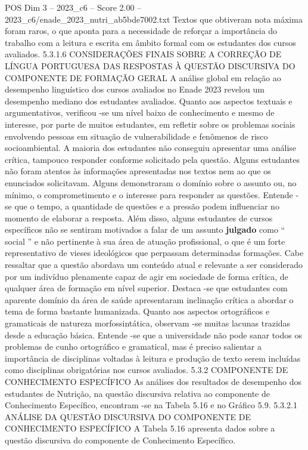 \begin{textsample}{POS Dim 3 – 2023\_c6 – Score 2.00 – 2023\_c6/enade\_2023\_nutri\_ab5bde7002.txt}
Textos que obtiveram nota máxima foram raros, o que aponta para a necessidade de reforçar a importância do trabalho com a leitura e escrita em âmbito formal com os estudantes dos cursos avaliados. 5.3.1.6 CONSIDERAÇÕES FINAIS SOBRE A CORREÇÃO DE LÍNGUA PORTUGUESA DAS RESPOSTAS À QUESTÃO DISCURSIVA DO COMPONENTE DE FORMAÇÃO GERAL A análise global em relação ao desempenho linguístico dos cursos avaliados no Enade 2023 revelou um desempenho mediano dos estudantes avaliados.
Quanto aos aspectos textuais e argumentativos, verificou -se um nível baixo de conhecimento e mesmo de interesse, por parte de muitos estudantes, em refletir sobre os problemas sociais envolvendo pessoas em situação de vulnerabilidade e fenômenos de risco socioambiental.
A maioria dos estudantes não conseguiu apresentar uma análise crítica, tampouco responder conforme solicitado pela questão.
Alguns estudantes não foram atentos às informações apresentadas nos textos nem ao que os enunciados solicitavam.
Alguns demonstraram o domínio sobre o assunto ou, no mínimo, o comprometimento e o interesse para responder as questões.
Entende -se que o tempo, a quantidade de questões e a pressão podem influenciar no momento de elaborar a resposta.
Além disso, alguns estudantes de cursos específicos não se sentiram motivados a falar de um assunto \textbf{julgado} como “ social ” e não pertinente à sua área de atuação profissional, o que é um forte representativo de vieses ideológicos que perpassam determinadas formações.
Cabe ressaltar que a questão abordava um conteúdo atual e relevante a ser considerado por um indivíduo plenamente capaz de agir em sociedade de forma crítica, de qualquer área de formação em nível superior.
Destaca -se que estudantes com aparente domínio da área de saúde apresentaram inclinação crítica a abordar o tema de forma bastante humanizada.
Quanto aos aspectos ortográficos e gramaticais de natureza morfossintática, observam -se muitas lacunas trazidas desde a educação básica.
Entende -se que a universidade não pode sanar todos os problemas de cunho ortográfico e gramatical, mas é preciso salientar a importância de disciplinas voltadas à leitura e produção de texto serem incluídas como disciplinas obrigatórias nos cursos avaliados. 5.3.2 COMPONENTE DE CONHECIMENTO ESPECÍFICO As análises dos resultados de desempenho dos estudantes de Nutrição, na questão discursiva relativa ao componente de Conhecimento Específico, encontram -se na Tabela 5.16 e no Gráfico 5.9. 5.3.2.1 ANÁLISE DA QUESTÃO DISCURSIVA DO COMPONENTE DE CONHECIMENTO ESPECÍFICO A Tabela 5.16 apresenta dados sobre a questão discursiva do componente de Conhecimento Específico.

\end{textsample}

